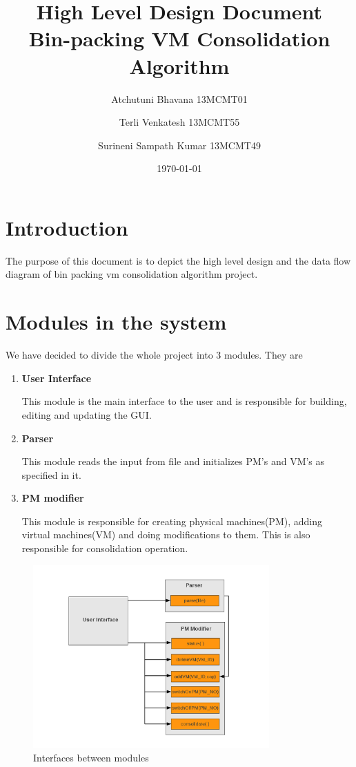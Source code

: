 \documentclass[a4paper,11pt]{article}
\title{High Level Design Document \\ Bin-packing VM Consolidation Algorithm}
\author{Atchutuni Bhavana 13MCMT01 \and Terli Venkatesh 13MCMT55 \and Surineni Sampath Kumar 13MCMT49}
\date{\today}
\begin{document}
\maketitle
\pagebreak
\tableofcontents
\pagebreak 

\section{Introduction}
The purpose of this document is to depict the high level
design and the data flow diagram of bin packing
vm consolidation algorithm project.
\section{Modules in the system}
We have decided to divide the whole project into 3 modules. They are
\begin{enumerate}
\item \textbf{ User Interface }

This module is the main interface to the user and  is responsible for building, editing and updating the GUI.
\item \textbf{ Parser }

This module reads the input from file and initializes PM’s and VM’s as specified in it.
\item \textbf{ PM modifier }

This module is responsible for creating physical machines(PM), adding virtual machines(VM) and doing modifications to them. This is also responsible for consolidation operation.  

\end{enumerate}

\begin{figure}[h]
\centering
\includegraphics[height=7cm]{images/intrfc.png}
\caption{Interfaces between modules}
\label{fig:interfaces}

\end{figure}
\end{document}
